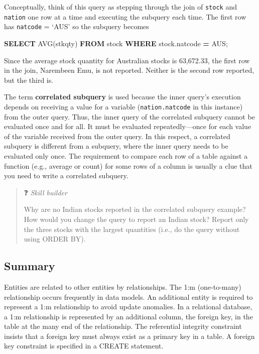 \documentclass[
]{article}
\newenvironment{Shaded}{\begin{snugshade}}{\end{snugshade}}
\newcommand{\FunctionTok}[1]{\textcolor[rgb]{0.00,0.00,0.00}{#1}}
\newcommand{\KeywordTok}[1]{\textcolor[rgb]{0.13,0.29,0.53}{\textbf{#1}}}
\newcommand{\NormalTok}[1]{#1}
\newcommand{\OperatorTok}[1]{\textcolor[rgb]{0.81,0.36,0.00}{\textbf{#1}}}
\newcommand{\StringTok}[1]{\textcolor[rgb]{0.31,0.60,0.02}{#1}}
\begin{document}
Conceptually, think of this query as stepping through the join of
\texttt{stock} and \texttt{nation} one row at a time and executing the
subquery each time. The first row has \texttt{natcode} = `AUS' so the
subquery becomes

\begin{Shaded}
\begin{Highlighting}[]
\KeywordTok{SELECT} \FunctionTok{AVG}\NormalTok{(stkqty) }\KeywordTok{FROM}\NormalTok{ stock}
    \KeywordTok{WHERE}\NormalTok{ stock.natcode }\OperatorTok{=} \StringTok{\textquotesingle{}AUS\textquotesingle{}}\NormalTok{;}
\end{Highlighting}
\end{Shaded}

Since the average stock quantity for Australian stocks is 63,672.33, the
first row in the join, Narembeen Emu, is not reported. Neither is the
second row reported, but the third is.

The term \textbf{correlated subquery} is used because the inner query's
execution depends on receiving a value for a variable
(\texttt{nation.natcode} in this instance) from the outer query. Thus,
the inner query of the correlated subquery cannot be evaluated once and
for all. It must be evaluated repeatedly---once for each value of the
variable received from the outer query. In this respect, a correlated
subquery is different from a subquery, where the inner query needs to be
evaluated only once. The requirement to compare each row of a table
against a function (e.g., average or count) for some rows of a column is
usually a clue that you need to write a correlated subquery.

\begin{quote}
❓ \emph{Skill builder}

Why are no Indian stocks reported in the correlated subquery example?
How would you change the query to report an Indian stock? Report only
the three stocks with the largest quantities (i.e., do the query without
using ORDER BY).
\end{quote}

\hypertarget{summary-1}{%
\subsection*{Summary}\label{summary-1}}

Entities are related to other entities by relationships. The 1:m
(one-to-many) relationship occurs frequently in data models. An
additional entity is required to represent a 1:m relationship to avoid
update anomalies. In a relational database, a 1:m relationship is
represented by an additional column, the foreign key, in the table at
the many end of the relationship. The referential integrity constraint
insists that a foreign key must always exist as a primary key in a
table. A foreign key constraint is specified in a CREATE statement.
\end{document}
